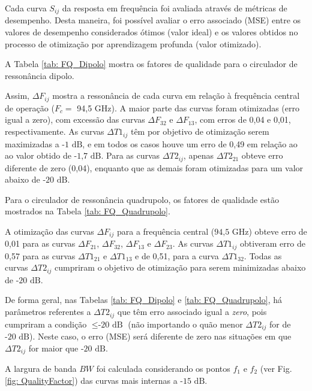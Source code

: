 Cada curva $S_{ij}$ da resposta em frequência foi avaliada através de métricas de desempenho. Desta maneira, foi possível avaliar o erro associado (MSE) entre os valores de desempenho considerados ótimos (valor ideal) e os valores obtidos no processo de otimização por aprendizagem profunda (valor otimizado).

A Tabela \ref{tab: FQ_Dipolo} mostra os fatores de qualidade para o circulador de ressonância dipolo. 



Assim, $\Delta F_{ij}$ mostra a ressonância de cada curva em relação à frequência central de operação ($F_{c} = $ 94,5 GHz). A maior parte das curvas foram otimizadas (erro igual a zero), com excessão das curvas $\Delta F_{32}$ e $\Delta F_{13}$, com erros de 0,04 e 0,01, respectivamente. As curvas $\Delta T1_{ij}$ têm por objetivo de otimização serem maximizadas a $\textrm{-1 dB}$, e em todos os casos houve um erro de 0,49 em relação ao ao valor obtido de $\textrm{-1,7 dB}$. Para as curvas $\Delta T2_{ij}$, apenas $\Delta T2_{21}$ obteve erro diferente de zero (0,04), enquanto que as demais foram otimizadas para um valor abaixo de $\textrm{-20 dB}$.

Para o circulador de ressonância quadrupolo, os fatores de qualidade estão mostrados na Tabela \ref{tab: FQ_Quadrupolo}.



A otimização das curvas $\Delta F_{ij}$ para a frequência central ($\textrm{94,5 GHz}$) obteve erro de 0,01 para as curvas $\Delta F_{21}$, $\Delta F_{32}$, $\Delta F_{13}$ e $\Delta F_{23}$. As curvas $\Delta T1_{ij}$ obtiveram erro de 0,57 para as curvas $\Delta T1_{21}$ e $\Delta T1_{13}$ e de 0,51, para a curva $\Delta T1_{32}$. Todas as curvas $\Delta T2_{ij}$ cumpriram o objetivo de otimização para serem minimizadas abaixo de $\textrm{-20 dB}$.

De forma geral, nas Tabelas \ref{tab: FQ_Dipolo} e \ref{tab: FQ_Quadrupolo}, há parâmetros referentes a $\Delta T2_{ij}$ que têm erro associado igual a \textit{zero}, pois cumpriram a condição $\leq \textrm{-20 dB}$ (não importando o quão menor $\Delta T2_{ij}$ for de $\textrm{-20 dB}$). Neste caso, o erro (MSE) será diferente de zero nas situações em que $\Delta T2_{ij}$ for maior que $\textrm{-20 dB}$.

A largura de banda $BW$ foi calculada considerando os pontos $f_{1}$ e $f_{2}$ (ver Fig. \ref{fig: QualityFactor}) das curvas mais internas a $\textrm{-15 dB}$.